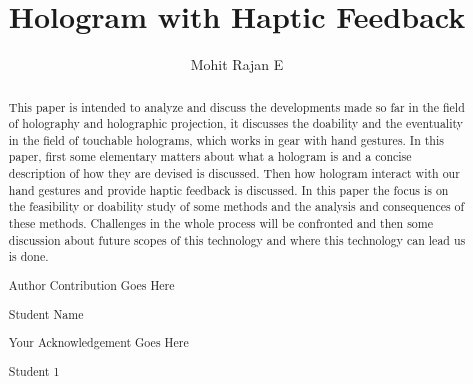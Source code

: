 \documentclass{fisatproject}
\title{Hologram with Haptic Feedback}
\author{Mohit Rajan E}
\begin{document}
\maketitle
\makecert

\newpage
{}
\setcounter{page}{1}
\thispagestyle{plain}
\renewcommand\abstractname{ABSTRACT}
\begin{abstract}
\vspace{5cm}
This paper is intended to analyze and discuss the developments made so far in the field of holography and holographic projection, it discusses the doability and the eventuality in the field of touchable holograms, which works in gear with hand gestures. In this paper, first some elementary matters about what a hologram is and a concise description of how they are devised is discussed. Then how hologram interact with our hand gestures and provide haptic feedback is discussed. In this paper the focus is on the feasibility or doability study of some methods and the analysis and consequences of these methods. Challenges in the whole process will be confronted and then some discussion about future scopes of this technology and where this technology can lead us is done.
\end{abstract}



\newpage
\renewcommand\abstractname{Contribution by Author}
\thispagestyle{plain}
\begin{abstract}
\vspace{5cm}
Author Contribution  Goes Here
\vspace{1cm}
\begin{flushright}
Student Name
\end{flushright}
\end{abstract}

\newpage
\renewcommand\abstractname{ACKNOWLEDGMENT}
\thispagestyle{plain}
\begin{abstract}
\vspace{5cm}
Your Acknowledgement Goes Here
\vspace{1cm}
\begin{flushright}
Student 1
\end{flushright}
\end{abstract}
\newpage

\restoregeometry
\tableofcontents
\newpage

\cleardoublepage
{}
\listoffigures
\newpage
\end{document}
